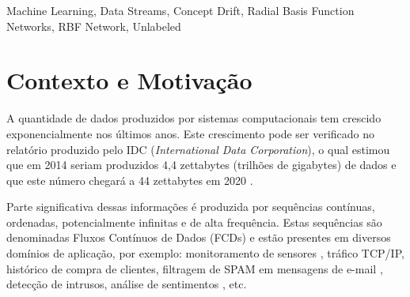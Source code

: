 \documentclass[qual, classic, a4paper]{ufbathesis}
\begin{document}
\abstract

\blindtext

\begin{keywords}
    Machine Learning, Data Streams, Concept Drift, Radial Basis Function Networks, RBF Network, Unlabeled
\end{keywords}


\tableofcontents

\listoffigures

\listoftables

\mainmatter

% 
% 
% 
%

 \label{introducao}

\section{Contexto e Motivação}

A quantidade de dados produzidos por sistemas computacionais tem crescido exponencialmente nos últimos anos.
Este crescimento pode ser verificado no relatório produzido pelo IDC (\textit{International Data Corporation}), o qual estimou que em 2014 seriam produzidos 4,4 zettabytes (trilhões de gigabytes) de dados e que este número chegará a 44 zettabytes em 2020 \cite{idc_report}.

Parte significativa dessas informações é produzida por sequências contínuas, ordenadas, potencialmente infinitas e de alta frequência.
Estas sequências são denominadas Fluxos Contínuos de Dados (FCDs) \cite{Feigenbaum:2003:ALD:589343.592594} e estão presentes em diversos domínios de aplicação, por exemplo:
monitoramento de sensores \cite{Lee:Wang:Ryu:2007},
tráfico TCP/IP, 
histórico de compra de clientes,
filtragem de SPAM em mensagens de e-mail \cite{Katakis:2010:TRC:1746286.1746291},
detecção de intrusos,
análise de sentimentos \cite{Smailovic:2014:SAL:2941772.2941857}, 
etc.
\end{document}
